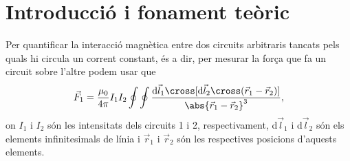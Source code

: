 \documentclass[a4paper,10.5pt]{report}
\begin{document}
\section{Introducció i fonament teòric}
Per quantificar la interacció magnètica entre dos circuits arbitraris tancats pels quals hi circula un corrent constant, és a dir, per mesurar la força que fa un circuit sobre l'altre podem usar que
\begin{equation}
	\vec{F}_1 = \frac{\mu_0}{4\pi}I_1I_2\oint \oint \frac{\mathrm{d}\vec{l}_1\cross[\mathrm{d}\vec{l}_2 \cross (\vec{r}_1-\vec{r}_2)]}{\abs{\vec{r}_1 - \vec{r}_2}^3}\label{eq:2.1},
\end{equation}
on $I_1$ i $I_2$ són les intensitats dels circuits 1 i 2, respectivament, d$\vec{l}_1$ i d$\vec{l}_2$ són els elements infinitesimals de línia i $\vec{r}_1$ i $\vec{r}_2$ són les respectives posicions d'aquests elements.
\end{document}
